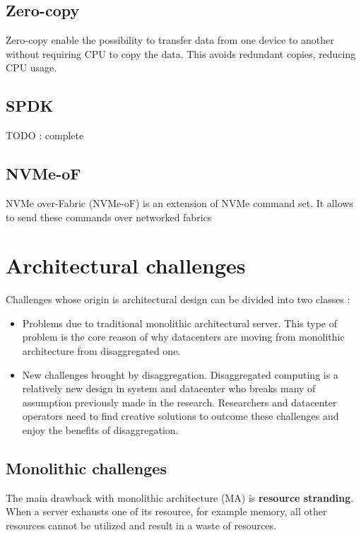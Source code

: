 \documentclass[11pt, a4paper]{article}
\begin{document}
\subsection{Zero-copy}

Zero-copy enable the possibility to transfer data from one device to another without requiring CPU to copy the data. This
avoids redundant copies, reducing CPU usage.

\subsection{SPDK}

TODO : complete

\subsection{NVMe-oF}

NVMe over-Fabric (NVMe-oF) is an extension of NVMe command set. It allows to send these commands over networked fabrics
\cite{noauthor_nvme_2021, noauthor_what_nodate, guz_nvme-over-fabrics_2017}

\section{Architectural challenges}

Challenges whose origin is architectural design can be divided into two classes :

\begin{itemize}
  \item Problems due to traditional monolithic architectural server. This type of problem is the core reason of why datacenters
    are moving from monolithic architecture from disaggregated one.
  \item New challenges brought by disaggregation. Disaggregated computing is a relatively new design in system and datacenter
    who breaks many of assumption previously made in the research. Researchers and datacenter operators need to find
    creative solutions to outcome these challenges and enjoy the benefits of disaggregation.
\end{itemize}

\subsection{Monolithic challenges}

The main drawback with monolithic architecture (MA) is \textbf{resource stranding}. When a server exhausts one of its resource,
for example memory, all other resources cannot be utilized and result in a waste of resources.
\end{document}
